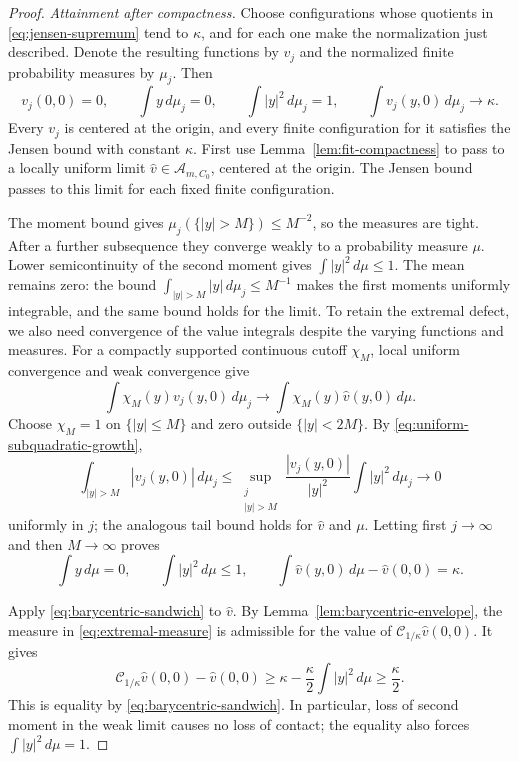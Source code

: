 \documentclass[11pt]{article}
\numberwithin{equation}{section}
\theoremstyle{definition}
\theoremstyle{remark}
\newcommand{\Cenv}{\mathcal{C}}
\newcommand{\Aclass}{\mathcal{A}}
\begin{document}
\begin{proof}
\emph{Attainment after compactness.}
Choose configurations whose quotients in
\eqref{eq:jensen-supremum} tend to $\kappa$, and for each one
make the normalization just described. Denote the resulting
functions by $v_j$ and the normalized finite probability
measures by $\mu_j$. Then
\[
  v_j(0,0)=0,\qquad
  \int y\,d\mu_j=0,\qquad
  \int |y|^2\,d\mu_j=1,\qquad
  \int v_j(y,0)\,d\mu_j\longrightarrow\kappa.
\]
Every $v_j$ is centered at the origin, and every finite
configuration for it satisfies the Jensen bound with constant
$\kappa$. First use Lemma~\ref{lem:fit-compactness} to pass to
a locally uniform limit $\widehat v\in\Aclass_{m,C_0}$,
centered at the origin. The Jensen bound passes to this limit
for each fixed finite configuration.

The moment bound gives
$\mu_j(\{|y|>M\})\le M^{-2}$, so the measures are tight.
After a further subsequence they converge weakly to a
probability measure $\mu$. Lower semicontinuity of the second
moment gives $\int|y|^2\,d\mu\le1$. The mean remains zero:
the bound
$\int_{|y|>M}|y|\,d\mu_j\le M^{-1}$ makes the first moments
uniformly integrable, and the same bound holds for the limit.
To retain the extremal defect, we also need convergence of the value
integrals despite the varying functions and measures. For a compactly
supported continuous cutoff $\chi_M$, local uniform
convergence and weak convergence give
\[
  \int\chi_M(y)v_j(y,0)\,d\mu_j
       \longrightarrow
  \int\chi_M(y)\widehat v(y,0)\,d\mu.
\]
Choose $\chi_M=1$ on $\{|y|\le M\}$ and zero outside
$\{|y|<2M\}$. By
\eqref{eq:uniform-subquadratic-growth},
\[
  \int_{|y|>M}|v_j(y,0)|\,d\mu_j
  \le
  \sup_{\substack{j\\|y|>M}}\frac{|v_j(y,0)|}{|y|^2}
       \int|y|^2\,d\mu_j
  \longrightarrow0
\]
uniformly in $j$; the analogous tail bound holds for
$\widehat v$ and $\mu$. Letting first $j\to\infty$ and then
$M\to\infty$ proves
\begin{equation}\label{eq:extremal-measure}
  \int y\,d\mu=0,\qquad
  \int|y|^2\,d\mu\le1,\qquad
  \int\widehat v(y,0)\,d\mu-\widehat v(0,0)=\kappa.
\end{equation}

Apply \eqref{eq:barycentric-sandwich} to $\widehat v$. By
Lemma~\ref{lem:barycentric-envelope}, the measure in
\eqref{eq:extremal-measure} is admissible for the value of
$\Cenv_{1/\kappa}\widehat v(0,0)$. It gives
\[
  \Cenv_{1/\kappa}\widehat v(0,0)-\widehat v(0,0)
     \ge\kappa-\frac{\kappa}{2}\int|y|^2\,d\mu
     \ge\frac{\kappa}{2}.
\]
This is equality by \eqref{eq:barycentric-sandwich}. In
particular, loss of second moment in the weak limit causes no
loss of contact; the equality also forces
$\int|y|^2\,d\mu=1$.


\end{proof}
\end{document}
